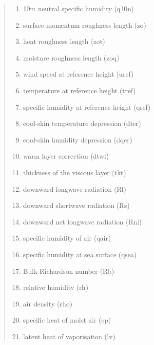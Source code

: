 \documentclass[letterpaper,10pt,english]{sphinxmanual}
\begin{document}
\begin{fulllineitems}
\begin{quote}
\begin{description}
\begin{itemize}
\begin{enumerate}
\item {} 
10m neutral specific humidity (q10n)
 
 \item {} 
surface momentum roughness length (zo)

\item {} 
heat roughness length (zot)

\item {} 
moisture roughness length (zoq)

\item {} 
wind speed at reference height (uref)

\item {} 
temperature at reference height (tref)

\item {} 
specific humidity at reference height (qref)

\item {} 
cool-skin temperature depression (dter)

\item {} 
cool-skin humidity depression (dqer)

\item {} 
warm layer correction (dtwl)

\item {} 
thickness of the viscous layer (tkt)

\item {} 
downward longwave radiation (Rl)

\item {} 
downward shortwave radiation (Rs)

\item {} 
downward net longwave radiation (Rnl)

\item {} 
specific humidity of air (qair)

\item {} 
specific humidity at sea surface (qsea)

\item {} 
Bulk Richardson number (Rb)

\item {} 
relative humidity (rh)

\item{}
air density (rho)

\item{}
specific heat of moist air (cp)

\item {} 
latent heat of vaporisation (lv)


\end{enumerate}
\end{itemize}
\end{description}
\end{quote}
\end{fulllineitems}
\end{document}
